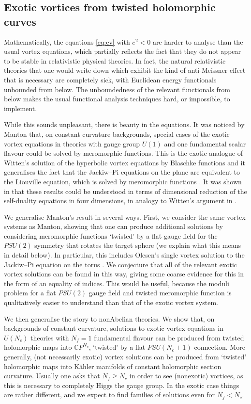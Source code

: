 \documentclass[10pt]{article}
\theoremstyle{definition}
\begin{document}
\subsection{Exotic vortices from twisted holomorphic curves}


Mathematically, the equations \eqref{eq:ev} with \(e^2 <0\) are harder to analyse than the usual vortex equations, which partially reflects the fact that they do not appear to be stable in relativistic physical theories. In fact, the natural relativistic theories that one would write down which exhibit the kind of anti-Meissner effect that is necessary are completely sick, with Euclidean energy functionals unbounded from below. The unboundedness of the relevant functionals from below makes the usual functional analysis techniques hard, or impossible, to implement. 


While this sounds unpleasant, there is beauty in the equations. It was noticed by Manton \cite{mantonFVE} that, on constant curvature backgrounds, special cases of the exotic vortex equations in theories with gauge group \(U(1)\) and one fundamental scalar flavour could be solved by meromorphic functions. This is the exotic analogue of Witten's solution of the hyperbolic vortex equations by Blaschke functions \cite{wittenMPS} and it generalises the fact that the Jackiw--Pi equations on the plane are equivalent to the Liouville equation, which is solved by meromorphic functions \cite{jackiwSSS,horvathyVS}. It was shown in \cite{contattoMF} that these results could be understood in terms of dimensional reduction of the self-duality equations in four dimensions, in analogy to Witten's argument in \cite{wittenMPS}. 

We generalise Manton's result in several ways. First, we consider the same vortex systems as Manton, showing that one can produce additional solutions by considering meromorphic functions `twisted' by a flat gauge field for the \(PSU(2)\) symmetry that rotates the target sphere (we explain what this means in detail below). In particular, this includes Olesen's single vortex solution to the Jackiw--Pi equation on the torus \cite{olesenSC}. We conjecture that all of the relevant exotic vortex solutions can be found in this way, giving some coarse evidence for this in the form of an equality of indices. This would be useful, because the moduli problem for a flat \(PSU(2)\) gauge field and twisted meromorphic function is qualitatively easier to understand than that of the exotic vortex system. 

We then generalise the story to nonAbelian theories. We show that, on backgrounds of constant curvature, solutions to exotic vortex equations in \(U(N_c)\) theories with \(N_f = 1\) fundamental flavour can be produced from twisted holomorphic maps into \(\mathbb{C}P^{N_c}\), `twisted' by a flat \(PSU(N_c+1)\) connection. More generally, (not necessarily exotic) vortex solutions can be produced from `twisted' holomorphic maps into K\"ahler manifolds of constant holomorphic section curvature. Usually one asks that \(N_f \geq N_c\) in order to see (nonexotic) vortices, as this is necessary to completely Higgs the gauge group. In the exotic case things are rather different, and we expect to find families of solutions even for \(N_f < N_c\). 
\end{document}
